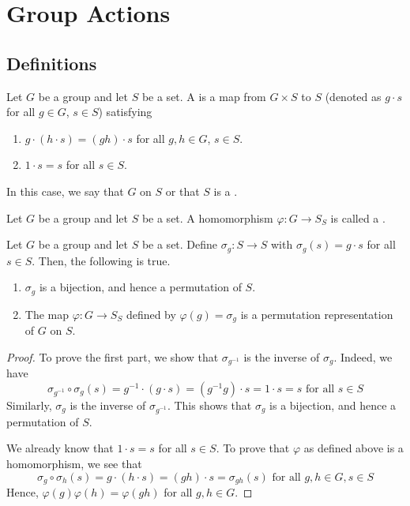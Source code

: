 \section{Group Actions}

\subsection{Definitions}

\begin{defn}
    Let $G$ be a group and let $S$ be a set. A  is a map from $G \times S$ to $S$ (denoted as $g\cdot s$ for all $g \in G$, $s \in S$) satisfying
    \begin{enumerate}
        \item $g \cdot (h \cdot s) = (gh) \cdot s$ for all $g,h \in G$, $s \in S$.
        \item $1 \cdot s = s$ for all $s \in S$.
    \end{enumerate}
    In this case, we say that $G$  on $S$ or that $S$ is a .
\end{defn}

\begin{defn}
    Let $G$ be a group and let $S$ be a set. A homomorphism $\varphi \colon G \to S_S$ is called a .
\end{defn}

\begin{theorem} \label{thm:action-gives-permutation}
    Let $G$ be a group and let $S$ be a set. Define $\sigma_g \colon S \to S$ with $\sigma_g(s) = g\cdot s$ for all $s \in S$. Then, the following is true.
    \begin{enumerate}
        \item $\sigma_g$ is a bijection, and hence a permutation of $S$.
        \item The map $\varphi \colon G \to S_S$ defined by $\varphi(g) = \sigma_g$ is a permutation representation of $G$ on $S$.
    \end{enumerate}
\end{theorem}
\begin{proof}
    To prove the first part, we show that $\sigma_{g^{-1}}$ is the inverse of $\sigma_g$. Indeed, we have
    \[
        \sigma_{g^{-1}} \circ \sigma_g (s) = g^{-1} \cdot (g \cdot s) = (g^{-1}g) \cdot s = 1\cdot s = s \text{ for all }s\in S
    \]
    Similarly, $\sigma_g$ is the inverse of $\sigma_{g^{-1}}$. This shows that $\sigma_g$ is a bijection, and hence a permutation of $S$. 
    
    We already know that $1\cdot s = s$ for all $s \in S$. To prove that $\varphi$ as defined above is a homomorphism, we see that
    \[
        \sigma_g\circ \sigma_h(s) = g \cdot (h \cdot s) = (gh) \cdot s = \sigma_{gh}(s) \text{ for all }g,h \in G, s \in S
    \]
    Hence, $\varphi(g)\varphi(h) = \varphi(gh)$ for all $g,h \in G$. 
\end{proof}

